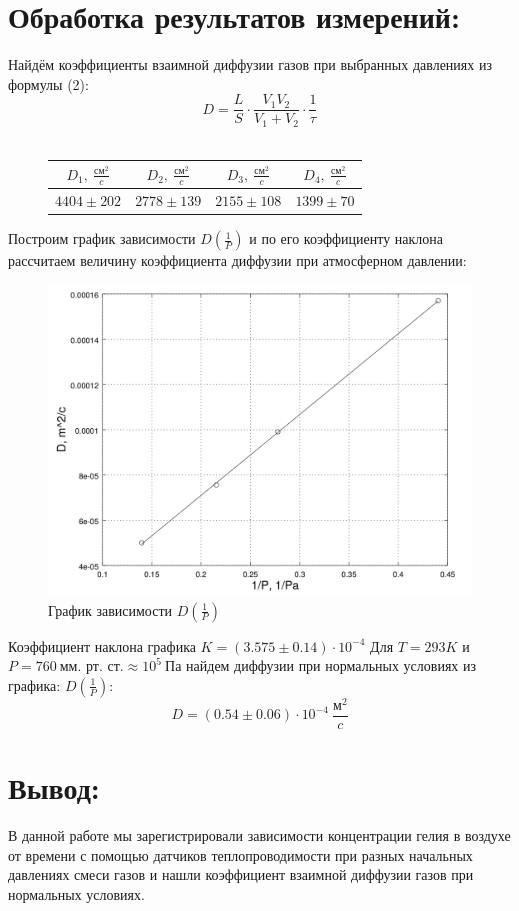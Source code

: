 \documentclass[a4paper, fontsize=12bp]{article}
\begin{document}
\section{Обработка результатов измерений:}
 Найдём коэффициенты взаимной диффузии газов при выбранных давлениях из формулы (2):
 \[
  D=\frac{L}{S} \cdot \frac{V_1V_2}{V_1+V_2} \cdot \frac{1}{\tau}
  \]
\\
\begin{figure}[H]
\center
\begin{tabular}{|c|c|c|c|}
\hline $D_1,\ \frac{\text{см}^2}{c}$ & $D_2,\ \frac{\text{см}^2}{c}$ & $D_3,\ \frac{\text{см}^2}{c}$ & $D_4,\ \frac{\text{см}^2}{c}$ \\
\hline $4404 \pm 202$ & $2778 \pm 139$ & $2155 \pm 108$ &  $1399 \pm 70$\\\hline
	\end{tabular}
\end{figure}
Построим график зависимости $D(\frac{1}{P})$ и по его коэффициенту наклона рассчитаем величину коэффициента диффузии при атмосферном давлении:
\begin{figure}[H]
\center
\includegraphics[scale=0.2]{dp.png}
\caption{График зависимости $D(\frac{1}{P})$}
\end{figure}
Коэффициент наклона графика $K = (3.575 \pm 0.14) \cdot 10^{-4}$
Для $T = 293 K$ и $P = 760\ \text{мм.\ рт.\ ст.} \approx 10^5\ \text{Па}$ найдем диффузии при нормальных условиях из графика:
$D(\frac{1}{P})$:
\[
	D = (0.54 \pm 0.06) \cdot 10^{-4}\ \frac{\text{м}^2}{c}
\]
\section*{Вывод:}
В данной работе мы зарегистрировали зависимости концентрации гелия в воздухе от времени с помощью датчиков теплопроводимости при разных начальных давлениях смеси газов и нашли коэффициент взаимной диффузии газов при нормальных условиях.
\end{document}
